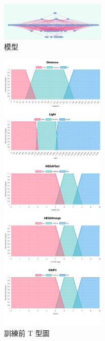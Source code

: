 \documentclass[twocolumn,11pt,a4paper]{article}
\begin{document}
\begin{figure}[htbp]
    \centering
    \includegraphics[width=0.45\textwidth]{res/image/model.png} %
    \caption{模型} %
    \label{fig:model}
\end{figure}

\begin{figure}[htbp]
    \centering
    \includegraphics[width=0.45\textwidth]{res/image/all_BT.png} %
    \caption{訓練前 T 型圖}
    \label{fig:all_BT}  
\end{figure}
\end{document}
